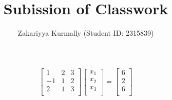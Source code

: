 \documentclass[12pt, a4paper]{article}
\title{Subission of Classwork}
\author{Zakariyya Kurmally (Student ID: 2315839)}
\begin{document}
\maketitle
\begin{gather*}
  \left[ \begin{array}{ccc}
    1 & 2 & 3 \\
    -1 & 1 & 2 \\
    2 & 1 & 3 \\
  \end{array} \right] 
  \left[ \begin{array}{c}
    x_1 \\
    x_2 \\
    x_3 \\
  \end{array} \right] 
  = 
  \left[ \begin{array}{c}
    6 \\
    2 \\
    6 \\
  \end{array} \right] \\[5pt]
\end{gather*}
\end{document}
